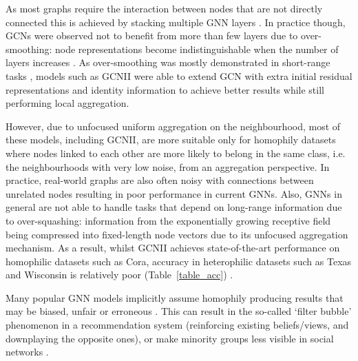 \documentclass{article}
\begin{document}
As most graphs require the interaction between nodes that are not directly connected this is achieved by stacking multiple GNN layers \cite{alon2020bottleneck}. In practice though, GCNs were observed not to benefit from more than few layers due to over-smoothing: node representations become indistinguishable when the number of layers increases \cite{wu2019simplifying}. As over-smoothing was mostly demonstrated in short-range tasks \cite{chen2020simple}, models such as \acrfull{GCNII} \cite{chen2020simple} were able to extend GCN with extra initial residual representations and identity information to achieve better results while still performing local aggregation.

However, due to unfocused uniform aggregation on the neighbourhood, most of these models, including GCNII, are more suitable only for homophily datasets where nodes linked to each other are more likely to belong in the same class, i.e. the neighbourhoods with very low noise, from an aggregation perspective.  In practice, real-world graphs are also often noisy with connections between unrelated nodes resulting in poor performance in current GNNs. Also, GNNs in general are not able to handle tasks that depend on long-range information due to over-squashing: information from the exponentially growing receptive field being compressed into fixed-length node vectors \cite{alon2020bottleneck} due to its unfocused aggregation mechanism. As a result, whilst GCNII achieves state-of-the-art performance on homophilic datasets such as Cora, accuracy in heterophilic datasets such as Texas and Wisconsin is relatively poor (Table~\ref{table_acc}) \cite{zhu2020beyond}.

Many popular GNN models implicitly assume homophily producing results that may be biased, unfair or erroneous \cite{maurya2021improving}. This can result in the so-called ‘filter bubble’ phenomenon in a recommendation system (reinforcing existing beliefs/views, and downplaying the opposite ones), or make minority groups less visible in social networks \cite{zhu2020beyond}.
\end{document}
